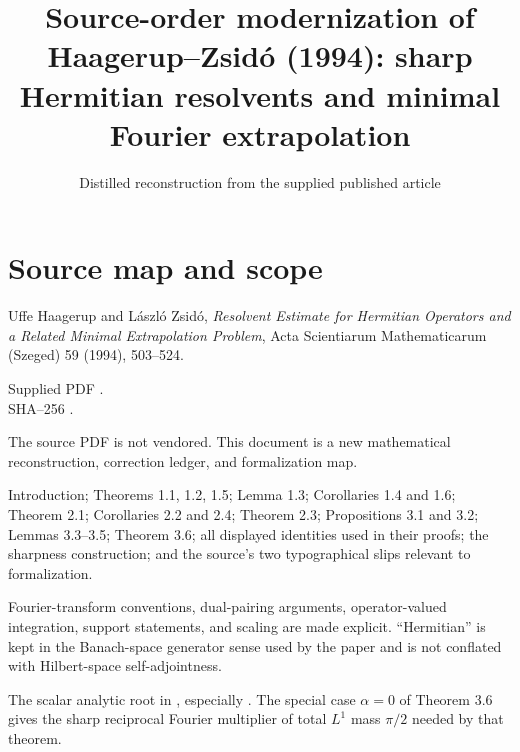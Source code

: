 
\newcommand{\M}{\mathcal{M}}
\newcommand{\Z}{\mathbb{Z}}
\newcommand{\supp}{\operatorname{supp}}
\newcommand{\sgn}{\operatorname{sgn}}
\newcommand{\TV}{\operatorname{TV}}
\newcommand{\cF}{\mathcal{F}}
\newcommand{\Lip}{\operatorname{Lip}}
\newcommand{\esssup}{\operatorname*{ess\,sup}}
\renewenvironment{formalizationmap}{%
  \begin{longtable}{@{}p{0.20\textwidth}p{0.31\textwidth}p{0.40\textwidth}@{}}%
  \toprule Source item & Modern mathematical content & Repository status \\\midrule\endhead%
}{\bottomrule\end{longtable}}
\title{Source-order modernization of Haagerup--Zsid\'o (1994): sharp Hermitian resolvents and minimal Fourier extrapolation}
\author{}
\date{Distilled reconstruction from the supplied published article}

\maketitle

\section*{Source map and scope}
\begin{sourceguide}
\item[Primary source] Uffe Haagerup and L\'aszl\'o Zsid\'o, \emph{Resolvent Estimate for Hermitian Operators and a Related Minimal Extrapolation Problem}, Acta Scientiarum Mathematicarum (Szeged) 59 (1994), 503--524.
\item[Local evidence] Supplied PDF .\\ SHA--256 \texttt{}.
\item[Redistribution] The source PDF is not vendored. This document is a new mathematical reconstruction, correction ledger, and formalization map.
\item[Coverage] Introduction; Theorems 1.1, 1.2, 1.5; Lemma 1.3; Corollaries 1.4 and 1.6; Theorem 2.1; Corollaries 2.2 and 2.4; Theorem 2.3; Propositions 3.1 and 3.2; Lemmas 3.3--3.5; Theorem 3.6; all displayed identities used in their proofs; the sharpness construction; and the source's two typographical slips relevant to formalization.
\item[Modernization] Fourier-transform conventions, dual-pairing arguments, operator-valued integration, support statements, and scaling are made explicit. ``Hermitian'' is kept in the Banach-space generator sense used by the paper and is not conflated with Hilbert-space self-adjointness.
\item[Formalization target] The scalar analytic root in
\texttt{}, especially
\texttt{}. The special case $\alpha=0$ of Theorem 3.6 gives the sharp reciprocal Fourier multiplier of total $L^1$ mass $\pi/2$ needed by that theorem.
\end{sourceguide}

